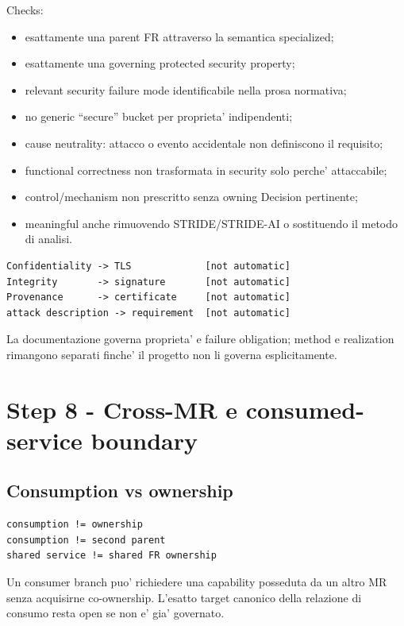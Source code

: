 \documentclass[11pt,a4paper]{article}
\begin{document}
Checks:
\begin{itemize}
  \item esattamente una parent FR attraverso la semantica specialized;
  \item esattamente una governing protected security property;
  \item relevant security failure mode identificabile nella prosa normativa;
  \item no generic ``secure'' bucket per proprieta' indipendenti;
  \item cause neutrality: attacco o evento accidentale non definiscono il requisito;
  \item functional correctness non trasformata in security solo perche' attaccabile;
  \item control/mechanism non prescritto senza owning Decision pertinente;
  \item meaningful anche rimuovendo STRIDE/STRIDE-AI o sostituendo il metodo di analisi.
\end{itemize}

\begin{ddtaanti}[title={Property != mechanism != attack cause}]
\begin{lstlisting}
Confidentiality -> TLS             [not automatic]
Integrity       -> signature       [not automatic]
Provenance      -> certificate     [not automatic]
attack description -> requirement  [not automatic]
\end{lstlisting}
La documentazione governa proprieta' e failure obligation; method e realization rimangono separati finche' il progetto non li governa esplicitamente.
\end{ddtaanti}

\section{Step 8 - Cross-MR e consumed-service boundary}
\closedtag

\subsection{Consumption vs ownership}
\begin{lstlisting}
consumption != ownership
consumption != second parent
shared service != shared FR ownership
\end{lstlisting}

Un consumer branch puo' richiedere una capability posseduta da un altro MR senza acquisirne co-ownership. L'esatto target canonico della relazione di consumo resta open se non e' gia' governato.
\end{document}
